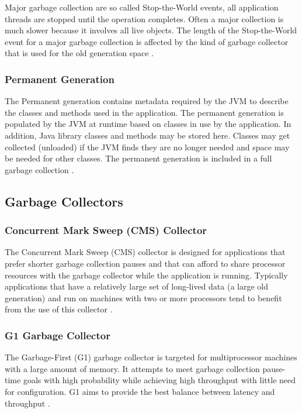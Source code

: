 \documentclass[11pt,a4paper]{article}
\begin{document}
Major garbage collection are so called Stop-the-World events, all application threads are stopped until the operation completes. Often a major collection is much slower because it involves all live objects. The length of the Stop-the-World event for a major garbage collection is affected by the kind of garbage collector that is used for the old generation space \cite{ORACLE_GC_BASICS}.

\subsubsection*{Permanent Generation}
The Permanent generation contains metadata required by the JVM to describe the classes and methods used in the application. The permanent generation is populated by the JVM at runtime based on classes in use by the application. In addition, Java library classes and methods may be stored here. Classes may get collected (unloaded) if the JVM finds they are no longer needed and space may be needed for other classes. The permanent generation is included in a full garbage collection \cite{ORACLE_GC_BASICS}.
\newpage

\subsection{Garbage Collectors}
\subsubsection*{Concurrent Mark Sweep (CMS) Collector}
The Concurrent Mark Sweep (CMS) collector is designed for applications that prefer shorter garbage collection pauses and that can afford to share processor resources with the garbage collector while the application is running. Typically applications that have a relatively large set of long-lived data (a large old generation) and run on machines with two or more processors tend to benefit from the use of this collector \cite{ORACLE_CMS}.

\subsubsection*{G1 Garbage Collector}
The Garbage-First (G1) garbage collector is targeted for multiprocessor machines with a large amount of memory. It attempts to meet garbage collection pause-time goals with high probability while achieving high throughput with little need for configuration. G1 aims to provide the best balance between latency and throughput \cite{ORACLE_G1}.
\end{document}
